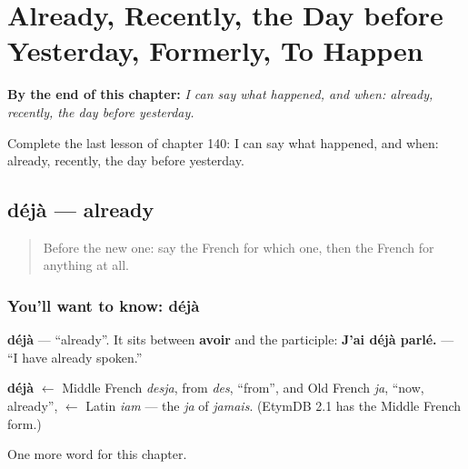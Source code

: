 
\chapter{Already, Recently, the Day before Yesterday, Formerly, To Happen}
\label{ch:fr-already-recently-the-day-before-yesterday-formerly-to-happen}

\begin{chapteropening}
\textbf{By the end of this chapter:} \emph{I can say what happened, and when: already, recently, the day before yesterday.}

Complete the last lesson of chapter 140: I can say what happened, and when: already, recently, the day before yesterday.
\end{chapteropening}

\section[déjà]{déjà — already}

\label{lesson:FR-C140-deja}



\begin{quote}
Before the new one: say the French for which one, then the French for anything at all.
\end{quote}

\subsection*{You'll want to know: déjà}
\textbf{déjà} — \textquotedblleft{}already\textquotedblright{}. It sits between \textbf{avoir} and the participle: \textbf{J'ai déjà parlé.} — \textquotedblleft{}I have already spoken.\textquotedblright{}

\begin{cousinweb}
\textbf{déjà} $\leftarrow$ Middle French \emph{desja}, from \emph{des}, \textquotedblleft{}from\textquotedblright{}, and Old French \emph{ja}, \textquotedblleft{}now, already\textquotedblright{}, $\leftarrow$ Latin \emph{iam} — the \emph{ja} of \emph{jamais}. (EtymDB 2.1 has the Middle French form.)
\end{cousinweb}

\begin{grammarlens}[title={What you've built}]
One more word for this chapter.
\end{grammarlens}


